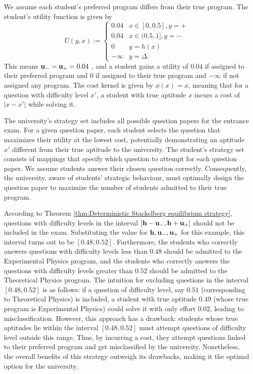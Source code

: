 \begin{exg}
We assume each student's preferred program differs from their true program. The student’s utility function is given by
\begin{equation}
	U(y,x) := \begin{cases}
		0.04 & x \in [0,0.5], y = \plus \\
		0.04 & x \in (0.5,1], y = \minus \\
		0 & y = h(x)\\
		-\infty & y = \Delta.
	\end{cases}
\end{equation}
This means $\mathbf{u_-} = \mathbf{u_+} = 0.04$ , and a student gains a utility of $0.04$ if assigned to their preferred program and $0$ if assigned to their true program and $-\infty$ if not assigned any program. The cost kernel is given by $\phi(x) = x$, meaning that for a question with difficulty level $x'$, a student with true aptitude $x$ incurs a cost of $|x - x'|$ while solving it.

The university's strategy set includes all possible question papers for the entrance exam. For a given question paper, each student selects the question that maximizes their utility at the lowest cost, potentially demonstrating an aptitude $x'$ different from their true aptitude to the university. The student’s strategy set consists of mappings that specify which question to attempt for each question paper. We assume students answer their chosen question correctly. Consequently, the university, aware of students' strategic behaviour, must optimally design the question paper to maximize the number of students admitted to their true program.

According to Theorem \ref{thm:Deterministic Stackelberg equilibrium strategy}, questions with difficulty levels in the interval $[\mathbf{h}- \mathbf{u_-},\mathbf{h}+\mathbf{u_+}]$ should not be included in the exam. Substituting the value for  $\mathbf{h},\mathbf{u_-},\mathbf{u_+}$ for this example, this interval turns out to be $[0.48,0.52]$. Furthermore, the students who correctly answers questions with difficulty levels less than $0.48$ should be admitted to the Experimental Physics program, and the students who correctly answers the questions with difficulty levels greater than $0.52$ should be admitted to the Theoretical Physics program. The intuition for excluding questions in the interval $[0.48,0.52]$ is as follows: if a question of difficulty level, say $0.51$ (corresponding to Theoretical Physics) is included, a student with true aptitude $0.49$ (whose true program is Experimental Physics) could solve it with only effort $0.02$, leading to misclassification. However, this approach has a drawback: students whose true aptitudes lie within the interval $[0.48,0.52]$ must attempt questions of difficulty level outside this range. Thus, by incurring a cost, they attempt questions linked to their preferred program and get misclassified by the university. Nonetheless, the overall benefits of this strategy outweigh its drawbacks, making it the optimal option for the university.

\end{exg}


